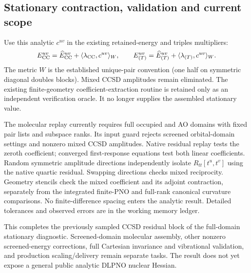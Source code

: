 \documentclass[11pt]{article}
\begin{document}
\subsection{Stationary contraction, validation and current scope}
Use this analytic $c^{uv}$ in the existing retained-energy and triples
multipliers:
\begin{equation}
 E_{\rm CC}^{uv}=\widehat E_{\rm CC}^{uv}
                   +\langle\lambda_{\rm CC},c^{uv}\rangle_W,\qquad
 E_{(T)}^{uv}=\widehat E_{(T)}^{uv}
                   +\langle\lambda_{(T)},c^{uv}\rangle_W.
\end{equation}
The metric $W$ is the established unique-pair convention (one half on
symmetric diagonal doubles blocks). Mixed CCSD amplitudes remain eliminated.
The existing finite-geometry coefficient-extraction routine is retained only
as an independent verification oracle. It no longer supplies the assembled
stationary value.

The molecular replay currently requires full occupied and AO domains
with fixed pair lists and subspace ranks. Its input guard rejects screened orbital-domain
settings and nonzero mixed CCSD amplitudes. Native residual replay tests the
zeroth coefficient; converged first-response equations test both linear
coefficients. Random symmetric amplitude directions independently isolate
$R_{tt}[t^u,t^v]$ using the native quartic residual. Swapping directions checks
mixed reciprocity. Geometry stencils check the mixed coefficient and its
adjoint contraction, separately from the integrated finite-PNO and full-rank
canonical curvature comparisons. No finite-difference spacing enters the
analytic result. Detailed tolerances and observed errors are in the working
memory ledger.

This completes the previously sampled CCSD residual block of the full-domain
stationary diagnostic. Screened-domain molecular assembly, other nonzero
screened-energy corrections, full Cartesian invariance and vibrational
validation, and production scaling/delivery remain separate tasks. The
result does not yet expose a general public analytic DLPNO nuclear Hessian.
\end{document}

